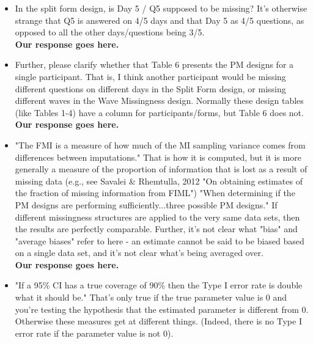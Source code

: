 \documentclass[letterpaper,12pt]{article}\usepackage[]{graphicx}\usepackage[]{color}
\begin{document}
\begin{itemize}
{\bf Our response goes here.}\\

\item In the split form design, is Day 5 / Q5 supposed to be missing? It's otherwise strange that Q5 is answered on 4/5 days and that Day 5 as 4/5 questions, as opposed to all the other days/questions being 3/5.\\

{\bf Our response goes here.}\\

\item Further, please clarify whether that Table 6 presents the PM designs for a single participant. That is, I think another participant would be missing different questions on different days in the Split Form design, or missing different waves in the Wave Missingness design. Normally these design tables (like Tables 1-4) have a column for participants/forms, but Table 6 does not.\\

{\bf Our response goes here.}\\

\item "The FMI is a measure of how much of the MI sampling variance comes from differences between imputations." That is how it is computed, but it is more generally a measure of the proportion of information that is lost as a result of missing data (e.g., see Savalei & Rhemtulla, 2012 "On obtaining estimates of the fraction of missing information from FIML") "When determining if the PM designs are performing sufficiently...three possible PM designs." If different missingness structures are applied to the very same data sets, then the results are perfectly comparable. Further, it's not clear what "bias" and "average biases" refer to here - an estimate cannot be said to be biased based on a single data set, and it's not clear what's being averaged over.\\ 

{\bf Our response goes here.}\\

\item "If a 95\% CI has a true coverage of 90\% then the Type I error rate is double what it should be." That's only true if the true parameter value is 0 and you're testing the hypothesis that the estimated parameter is different from 0. Otherwise these measures get at different things. (Indeed, there is no Type I error rate if the parameter value is not 0).\\


\end{itemize}
\end{document}
